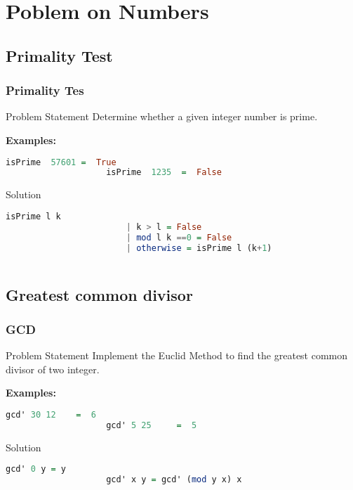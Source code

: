 \section{Poblem on Numbers}
\frame{\sectionpage}
\subsection{Primality Test}
\begin{frame}[fragile]\frametitle{Primality Tes}


\begin{block}{Problem Statement}
			Determine whether a given integer number is prime.
\end{block} \pause	
\textbf{Examples:}
		\begin{lstlisting}[language=Haskell,basicstyle=\footnotesize\ttfamily]
					isPrime  57601 =  True
					isPrime  1235  =  False
		\end{lstlisting}
\pause
\begin{alertblock}{Solution}
			\begin{lstlisting}[language=Haskell,basicstyle=\footnotesize\ttfamily]
					isPrime l k 
						| k > l = False
						| mod l k ==0 = False
						| otherwise = isPrime l (k+1) 
					
		\end{lstlisting}
\end{alertblock}	

\end{frame}

\subsection{Greatest common divisor}
\begin{frame}[fragile]\frametitle{GCD}


\begin{block}{Problem Statement}
			Implement the Euclid Method to find the greatest common divisor of two
			integer.
			 \end{block} \pause	
\textbf{Examples:}
		\begin{lstlisting}[language=Haskell,basicstyle=\footnotesize\ttfamily]
					gcd' 30 12 	  =  6
					gcd' 5 25     =  5
		\end{lstlisting}
\pause
\begin{alertblock}{Solution}
			\begin{lstlisting}[language=Haskell,basicstyle=\footnotesize\ttfamily]
					gcd' 0 y = y
					gcd' x y = gcd' (mod y x) x
		\end{lstlisting}
\end{alertblock}	

\end{frame}

